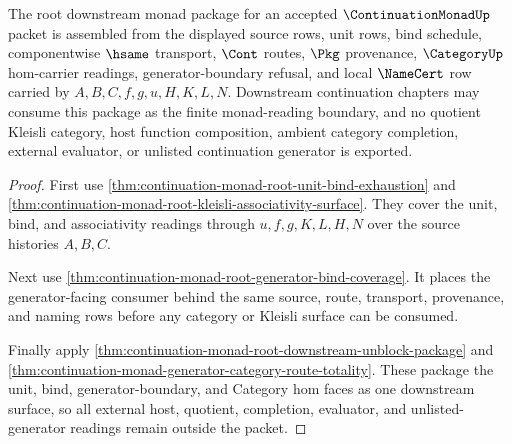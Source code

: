 \begin{theorem}
\label{thm:continuation-monad-root-downstream-monad-package}
The root downstream monad package for an accepted $\ContinuationMonadUp$ packet is assembled from the displayed source rows, unit rows, bind schedule, componentwise $\hsame$ transport, $\Cont$ routes, $\Pkg$ provenance, $\CategoryUp$ hom-carrier readings, generator-boundary refusal, and local $\NameCert$ row carried by $A,B,C,f,g,u,H,K,L,N$. Downstream continuation chapters may consume this package as the finite monad-reading boundary, and no quotient Kleisli category, host function composition, ambient category completion, external evaluator, or unlisted continuation generator is exported.
\end{theorem}
\begin{proof}
First use \autoref{thm:continuation-monad-root-unit-bind-exhaustion} and \autoref{thm:continuation-monad-root-kleisli-associativity-surface}. They cover the unit, bind, and associativity readings through $u,f,g,K,L,H,N$ over the source histories $A,B,C$.

Next use \autoref{thm:continuation-monad-root-generator-bind-coverage}. It places the generator-facing consumer behind the same source, route, transport, provenance, and naming rows before any category or Kleisli surface can be consumed.

Finally apply \autoref{thm:continuation-monad-root-downstream-unblock-package} and \autoref{thm:continuation-monad-generator-category-route-totality}. These package the unit, bind, generator-boundary, and Category hom faces as one downstream surface, so all external host, quotient, completion, evaluator, and unlisted-generator readings remain outside the packet.
\end{proof}
